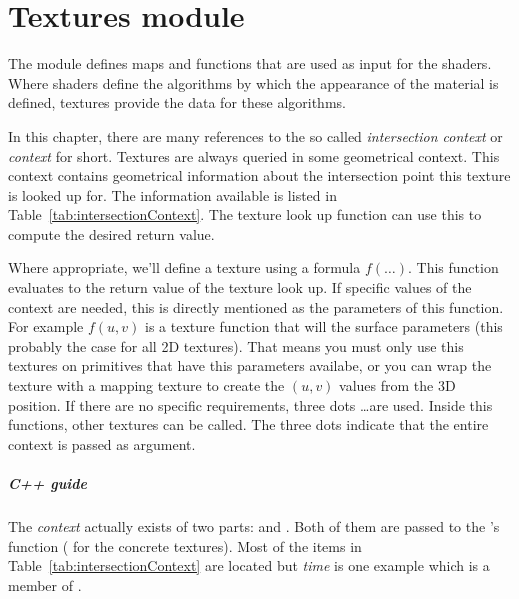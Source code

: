 %

\chapter{Textures module}

The  module defines maps and functions that are used as input for the shaders.  Where shaders define the algorithms by which the appearance of the material is defined, textures provide the data for these algorithms.

In this chapter, there are many references to the so called \emph{intersection context} or \emph{context} for short.  Textures are always queried in some geometrical context.  This context contains geometrical information about the intersection point this texture is looked up for.  The information available is listed in Table~\ref{tab:intersectionContext}.  The texture look up function can use this to compute the desired return value.

Where appropriate, we'll define a texture using a formula $f\left(\ldots\right)$.  This function evaluates to the return value of the texture look up.  If specific values of the context are needed, this is directly mentioned as the parameters of this function.  For example $f\left(u, v\right)$ is a texture function that will the surface parameters (this probably the case for all 2D textures).  That means you must only use this textures on primitives that have this parameters availabe, or you can wrap the texture with a mapping texture to create the $\left(u, v\right)$ values from the 3D position.  If there are no specific requirements, three dots \ldots are used.  Inside this functions, other textures can be called.  The three dots indicate that the entire context is passed as argument.

\paragraph{C++ guide}

The \emph{context} actually exists of two parts:  and .  Both of them are passed to the 's  function ( for the concrete textures).  Most of the items in Table~\ref{tab:intersectionContext} are located  but \emph{time} is one example which is a member of .


